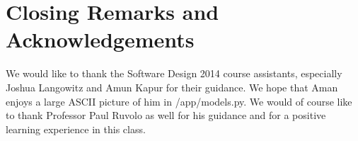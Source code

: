 \documentclass{article}
\begin{document}
\section*{Closing Remarks and Acknowledgements}
We would like to thank the Software Design 2014 course assistants, especially Joshua Langowitz and Amun Kapur for their guidance.  We hope that Aman enjoys a large ASCII picture of him in /app/models.py. We would of course like to thank Professor Paul Ruvolo as well for his guidance and for a positive learning experience in this class.
\end{document}
